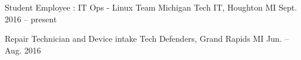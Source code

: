 

\begin{cvhonors}

  \cvhonor
    {Student Employee : IT Ops - Linux Team} %
    {Michigan Tech IT, Houghton MI} %
    {Sept. 2016 – present} %
    {} %

  \cvhonor
    {Repair Technician and Device intake} %
    {Tech Defenders, Grand Rapids MI} %
    {Jun. – Aug. 2016} %
    {} %

\end{cvhonors}
